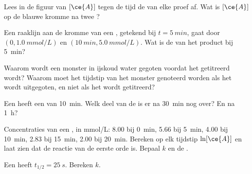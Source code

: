 \begin{exercise}[$\star$]\label{exo:g12:reaction-rates:2}
Lees in de figuur van $[\ce{A}]$ tegen de tijd de  van elke
proef af. Wat is $[\ce{A}]$ op de blauwe kromme na twee ?
\end{exercise}

\begin{exercise}[$\star$]\label{exo:g12:reaction-rates:3}
Een raaklijn aan de kromme van een , getekend bij
$t = \qty{5}{min}$, gaat door $(0, \qty{1.0}{mmol/L})$ en
$(\qty{10}{min}, \qty{5.0}{mmol/L})$. Wat is de  van het
product bij \qty{5}{min}?
\end{exercise}

\begin{exercise}[$\star$]\label{exo:g12:reaction-rates:4}
Waarom wordt een monster in ijskoud water gegoten voordat het getitreerd
wordt? Waarom moet het tijdstip van het monster genoteerd worden als het
wordt uitgegoten, en niet als het wordt getitreerd?
\end{exercise}

\begin{exercise}[$\star$]\label{exo:g12:reaction-rates:5}
Een  heeft een  van \qty{10}{min}. Welk
deel van de  is er na \qty{30}{min} nog over? En na \qty{1}{h}?
\end{exercise}

\begin{exercise}[$\star\star$]\label{exo:g12:reaction-rates:6}
Concentraties van een , in \si{mmol/L}: 8.00 bij \qty{0}{min},
5.66 bij \qty{5}{min}, 4.00 bij \qty{10}{min}, 2.83 bij \qty{15}{min},
2.00 bij \qty{20}{min}. Bereken op elk tijdstip $\ln[\ce{A}]$ en laat zien
dat de reactie van de eerste orde is. Bepaal $k$ en de .
\end{exercise}

\begin{exercise}[$\star\star$]\label{exo:g12:reaction-rates:7}
Een  heeft $t_{1/2} = \qty{25}{s}$. Bereken $k$.
\end{exercise}

